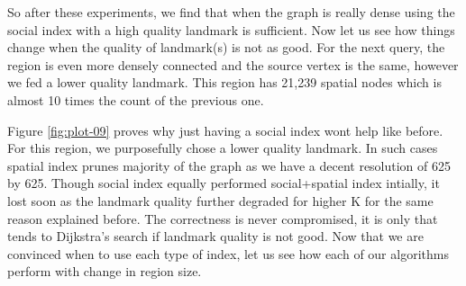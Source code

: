So after these experiments, we find that when the graph is really dense using the social index with a high quality landmark is sufficient. Now let us see how things change when the quality of landmark(s) is not as good. For the next query, the region is even more densely connected and the source vertex is the same, however we fed a lower quality landmark. This region has 21,239 spatial nodes which is almost 10 times the count of the previous one.

Figure \ref{fig:plot-09} proves why just having a social index wont help like before. For this region, we purposefully chose a lower quality landmark. In such cases spatial index prunes majority of the graph as we have a decent resolution of 625 by 625. Though social index equally performed social+spatial index intially, it lost soon as the landmark quality further degraded for higher K for the same reason explained before. The correctness is never compromised, it is only that {\rrp} tends to Dijkstra's search if landmark quality is not good. Now that we are convinced when to use each type of index, let us see how each of our algorithms perform with change in region size.

